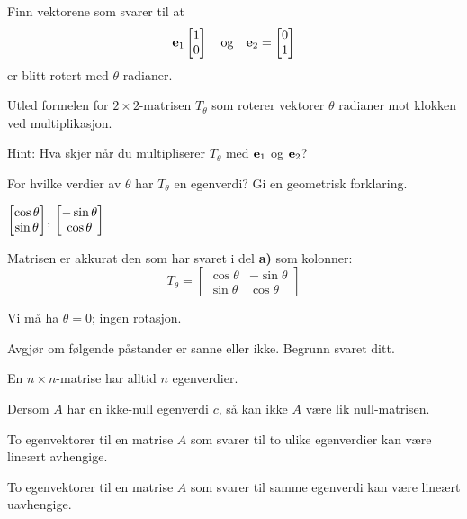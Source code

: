 \begin{oppgave}

\begin{punkt}
Finn vektorene som svarer til at $$\mathbf{e}_1\begin{bmatrix} 1 \\ 0 \end{bmatrix}\quad \text{og}\quad\mathbf{e}_2= \begin{bmatrix} 0 \\ 1 \end{bmatrix}$$ er blitt rotert med $\theta$ radianer.
\end{punkt}

\begin{punkt}
Utled formelen for $2 \times 2$-matrisen $T_\theta$ som roterer vektorer $\theta$ radianer mot klokken ved multiplikasjon.

\noindent
Hint: Hva skjer når du multipliserer $T_\theta$ med $\mathbf{e}_1$ og $\mathbf{e}_2$?
\end{punkt}

\begin{punkt}
For hvilke verdier av $\theta$ har $T_\theta$ en egenverdi? Gi en geometrisk forklaring.
\end{punkt}


\end{oppgave}


\begin{losning}

\begin{punkt}
$\begin{bmatrix} \cos\theta \\ \sin\theta \end{bmatrix}$, $\begin{bmatrix} -\sin\theta \\ \cos\theta \end{bmatrix}$
\end{punkt}

\begin{punkt}
Matrisen er akkurat den som har svaret i del \textbf{a)} som kolonner:
$$T_\theta=\begin{bmatrix}
\cos\theta & -\sin\theta\\
\sin\theta & \cos\theta
\end{bmatrix}$$
\end{punkt}

\begin{punkt}
Vi må ha $\theta=0$; ingen rotasjon.
\end{punkt}

\end{losning}

\begin{oppgave}
Avgjør om følgende påstander er sanne eller ikke. Begrunn svaret ditt.

\begin{punkt}
En $n\times n$-matrise har alltid $n$ egenverdier.
\end{punkt}

\begin{punkt}
Dersom $A$ har en ikke-null egenverdi $c$, så kan ikke $A$ være lik null-matrisen.
\end{punkt}

\begin{punkt}
To egenvektorer til en matrise $A$ som svarer til to ulike egenverdier kan være lineært avhengige.
\end{punkt}

\begin{punkt}
To egenvektorer til en matrise $A$ som svarer til samme egenverdi kan være lineært uavhengige.
\end{punkt}



\end{oppgave}

